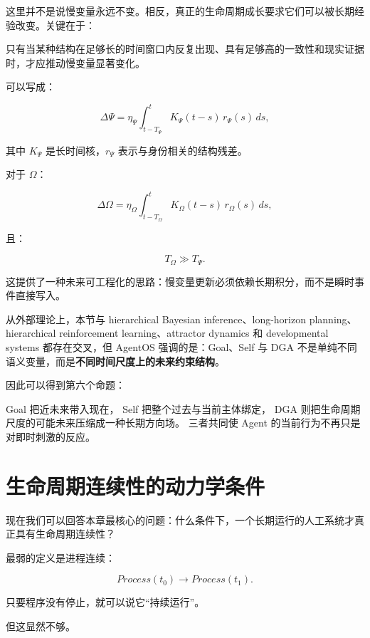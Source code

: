 这里并不是说慢变量永远不变。相反，真正的生命周期成长要求它们可以被长期经验改变。关键在于：

\begin{statementbox}
\centering
{}
\end{statementbox}

只有当某种结构在足够长的时间窗口内反复出现、具有足够高的一致性和现实证据时，才应推动慢变量显著变化。

可以写成：

\[
\Delta\Psi
=
\eta_\Psi
\int_{t-T_\Psi}^{t}
K_\Psi(t-s)
\,r_\Psi(s)
\,ds,
\]

其中 $K_\Psi$ 是长时间核，$r_\Psi$ 表示与身份相关的结构残差。

对于 $\Omega$：

\[
\Delta\Omega
=
\eta_\Omega
\int_{t-T_\Omega}^{t}
K_\Omega(t-s)
\,r_\Omega(s)
\,ds,
\]

且：

\[
T_\Omega
\gg
T_\Psi.
\]

这提供了一种未来可工程化的思路：慢变量更新必须依赖长期积分，而不是瞬时事件直接写入。

从外部理论上，本节与 hierarchical Bayesian inference、long-horizon planning、hierarchical reinforcement learning、attractor dynamics 和 developmental systems 都存在交叉，但 AgentOS 强调的是：Goal、Self 与 DGA 不是单纯不同语义变量，而是\textbf{不同时间尺度上的未来约束结构}。

因此可以得到第六个命题：

\begin{proposition*}
Goal 把近未来带入现在，
Self 把整个过去与当前主体绑定，
DGA 则把生命周期尺度的可能未来压缩成一种长期方向场。
三者共同使 Agent 的当前行为不再只是对即时刺激的反应。
\end{proposition*}

\section{生命周期连续性的动力学条件}

现在我们可以回答本章最核心的问题：什么条件下，一个长期运行的人工系统才真正具有生命周期连续性？

最弱的定义是进程连续：

\[
Process(t_0)
\rightarrow
Process(t_1).
\]

只要程序没有停止，就可以说它“持续运行”。

但这显然不够。

